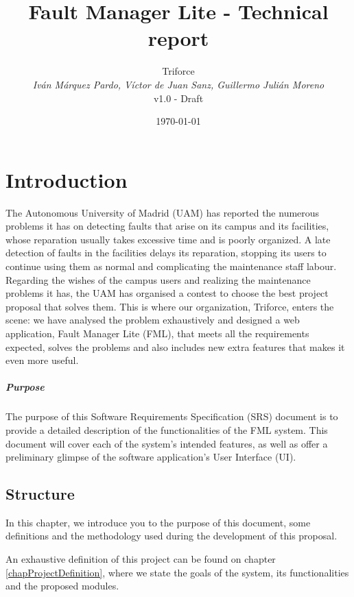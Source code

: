 \documentclass{report}
\title{Fault Manager Lite - Technical report}
\date{\today}
\author{{\Large Triforce} \\ \vspace{5pt} \textit{Iván Márquez Pardo, Víctor de Juan Sanz, Guillermo Julián Moreno} \\ v1.0 - Draft}
\begin{document}
\maketitle

\begin{abstract}

\end{abstract}
\tableofcontents
\newpage
\pagestyle{plain}

\chapter{Introduction}

The Autonomous University of Madrid (UAM) has reported the numerous problems it has on detecting faults that arise on its campus and its facilities, whose reparation usually takes excessive time and is poorly organized. A late detection of faults in the facilities delays its reparation, stopping its users to continue using them as normal and complicating the maintenance staff labour. Regarding the wishes of the campus users and realizing the maintenance problems it has, the UAM has organised a contest to choose the best project proposal that solves them.
This is where our organization, Triforce, enters the scene: we have analysed the problem exhaustively and designed a web application, Fault Manager Lite (FML), that meets all the requirements expected, solves the problems and also includes new extra features that makes it even more useful.

\paragraph{Purpose} The purpose of this Software Requirements Specification (SRS) document is to provide a detailed description of the functionalities of the FML system. This document will cover each of the system's intended features, as well as offer a preliminary glimpse of the software application's User Interface (UI).

\section{Structure}

In this chapter, we introduce you to the purpose of this document, some definitions and the methodology used during the development of this proposal.

An exhaustive definition of this project can be found on chapter \ref{chapProjectDefinition}, where we state the goals of the system, its functionalities and the proposed modules.
\end{document}
